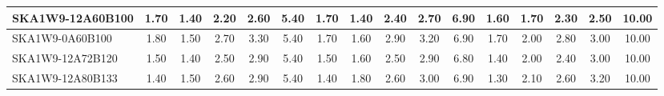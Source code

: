 \begin{table}[H]
{{\begin{tabular}{|lccccc||ccccc||ccccc|}
SKA1W9-12A60B100 & 1.70 \cellcolor{blue!49.50} & 1.40 \cellcolor{red!18.00} & 2.20 \cellcolor{green!28.50} & 2.60 \cellcolor{orange!18.00} & 5.40 \cellcolor{purple!60.00} & 1.70 \cellcolor{blue!49.50} & 1.40 \cellcolor{red!18.00} & 2.40 \cellcolor{green!25.00} & 2.70 \cellcolor{orange!25.00} & 6.90 \cellcolor{purple!43.20} & 1.60 \cellcolor{blue!43.20} & 1.70 \cellcolor{red!28.50} & 2.30 \cellcolor{green!25.00} & 2.50 \cellcolor{orange!23.25} & 10.00 \cellcolor{purple!60.00}\\ \hline 
SKA1W9-0A60B100 & 1.80 \cellcolor{blue!60.00} & 1.50 \cellcolor{red!24.00} & 2.70 \cellcolor{green!54.75} & 3.30 \cellcolor{orange!60.00} & 5.40 \cellcolor{purple!60.00} & 1.70 \cellcolor{blue!49.50} & 1.60 \cellcolor{red!28.50} & 2.90 \cellcolor{green!60.00} & 3.20 \cellcolor{orange!60.00} & 6.90 \cellcolor{purple!43.20} & 1.70 \cellcolor{blue!51.60} & 2.00 \cellcolor{red!44.25} & 2.80 \cellcolor{green!60.00} & 3.00 \cellcolor{orange!49.50} & 10.00 \cellcolor{purple!60.00}\\ \hline 
SKA1W9-12A72B120 & 1.50 \cellcolor{blue!28.50} & 1.40 \cellcolor{red!18.00} & 2.50 \cellcolor{green!44.25} & 2.90 \cellcolor{orange!36.00} & 5.40 \cellcolor{purple!60.00} & 1.50 \cellcolor{blue!28.50} & 1.60 \cellcolor{red!28.50} & 2.50 \cellcolor{green!32.00} & 2.90 \cellcolor{orange!39.00} & 6.80 \cellcolor{purple!34.80} & 1.40 \cellcolor{blue!26.40} & 2.00 \cellcolor{red!44.25} & 2.40 \cellcolor{green!32.00} & 3.00 \cellcolor{orange!49.50} & 10.00 \cellcolor{purple!60.00}\\ \hline 
SKA1W9-12A80B133 & 1.40 \cellcolor{blue!18.00} & 1.50 \cellcolor{red!24.00} & 2.60 \cellcolor{green!49.50} & 2.90 \cellcolor{orange!36.00} & 5.40 \cellcolor{purple!60.00} & 1.40 \cellcolor{blue!18.00} & 1.80 \cellcolor{red!39.00} & 2.60 \cellcolor{green!39.00} & 3.00 \cellcolor{orange!46.00} & 6.90 \cellcolor{purple!43.20} & 1.30 \cellcolor{blue!18.00} & 2.10 \cellcolor{red!49.50} & 2.60 \cellcolor{green!46.00} & 3.20 \cellcolor{orange!60.00} & 10.00 \cellcolor{purple!60.00}\\ \hline 
\end{tabular}}
\vspace{-0.300000cm}
\hspace{1cm} 
}
\end{table}
